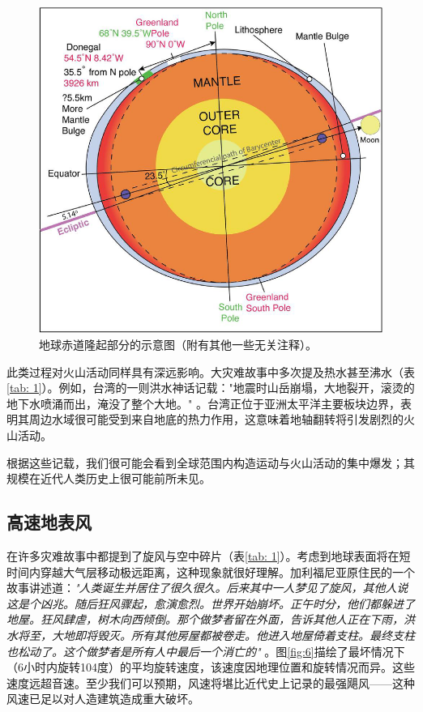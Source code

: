 \documentclass[10pt,twocolumn,letterpaper]{article}
\begin{document}
\begin{figure}[t]
\begin{center}
   \includegraphics[width=1\linewidth]{bulgecrop.png}
\end{center}
   \caption{地球赤道隆起部分的示意图（附有其他一些无关注释）\cite{16}。}
\label{fig:5}
\label{fig:onecol}
\end{figure}

此类过程对火山活动同样具有深远影响。大灾难故事中多次提及热水甚至沸水（表\ref{tab: 1}）。例如，台湾的一则洪水神话记载："地震时山岳崩塌，大地裂开，滚烫的地下水喷涌而出，淹没了整个大地。" \cite{17}。台湾正位于亚洲太平洋主要板块边界，表明其周边水域很可能受到来自地底的热力作用，这意味着地轴翻转将引发剧烈的火山活动。

根据这些记载，我们很可能会看到全球范围内构造运动与火山活动的集中爆发；其规模在近代人类历史上很可能前所未见。
\subsection{高速地表风}

在许多灾难故事中都提到了旋风与空中碎片（表\ref{tab: 1}）。考虑到地球表面将在短时间内穿越大气层移动极远距离，这种现象就很好理解。加利福尼亚原住民的一个故事讲述道：\textit{"人类诞生并居住了很久很久。后来其中一人梦见了旋风，其他人说这是个凶兆。随后狂风骤起，愈演愈烈。世界开始崩坏。正午时分，他们都躲进了地屋。狂风肆虐，树木向西倾倒。那个做梦者留在外面，告诉其他人正在下雨，洪水将至，大地即将毁灭。所有其他房屋都被卷走。他进入地屋倚着支柱。最终支柱也松动了。这个做梦者是所有人中最后一个消亡的"} \cite{17}。图\ref{fig:6}描绘了最坏情况下（6小时内旋转104度）的平均旋转速度，该速度因地理位置和旋转情况而异。这些速度远超音速。至少我们可以预期，风速将堪比近代史上记录的最强飓风——这种风速已足以对人造建筑造成重大破坏。
\end{document}
